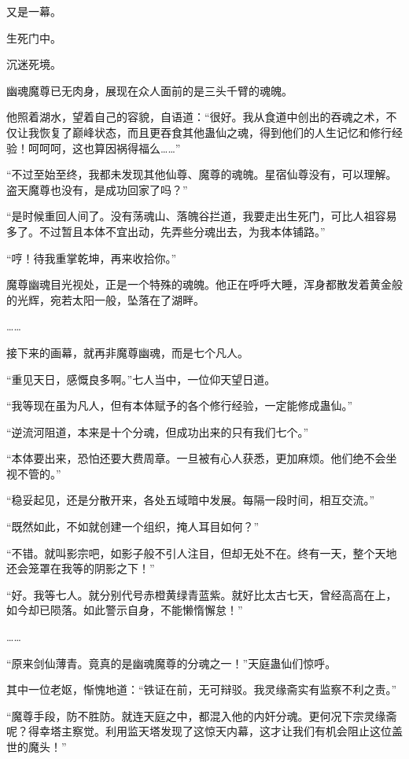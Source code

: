 
\begin{this_body}

又是一幕。

生死门中。

沉迷死境。

幽魂魔尊已无肉身，展现在众人面前的是三头千臂的魂魄。

他照着湖水，望着自己的容貌，自语道：“很好。我从食道中创出的吞魂之术，不仅让我恢复了巅峰状态，而且更吞食其他蛊仙之魂，得到他们的人生记忆和修行经验！呵呵呵，这也算因祸得福么……”

“不过至始至终，我都未发现其他仙尊、魔尊的魂魄。星宿仙尊没有，可以理解。盗天魔尊也没有，是成功回家了吗？”

“是时候重回人间了。没有荡魂山、落魄谷拦道，我要走出生死门，可比人祖容易多了。不过暂且本体不宜出动，先弄些分魂出去，为我本体铺路。”

“哼！待我重掌乾坤，再来收拾你。”

魔尊幽魂目光视处，正是一个特殊的魂魄。他正在呼呼大睡，浑身都散发着黄金般的光辉，宛若太阳一般，坠落在了湖畔。

……

接下来的画幕，就再非魔尊幽魂，而是七个凡人。

“重见天日，感慨良多啊。”七人当中，一位仰天望日道。

“我等现在虽为凡人，但有本体赋予的各个修行经验，一定能修成蛊仙。”

“逆流河阻道，本来是十个分魂，但成功出来的只有我们七个。”

“本体要出来，恐怕还要大费周章。一旦被有心人获悉，更加麻烦。他们绝不会坐视不管的。”

“稳妥起见，还是分散开来，各处五域暗中发展。每隔一段时间，相互交流。”

“既然如此，不如就创建一个组织，掩人耳目如何？”

“不错。就叫影宗吧，如影子般不引人注目，但却无处不在。终有一天，整个天地还会笼罩在我等的阴影之下！”

“好。我等七人。就分别代号赤橙黄绿青蓝紫。就好比太古七天，曾经高高在上，如今却已陨落。如此警示自身，不能懒惰懈怠！”

……

“原来剑仙薄青。竟真的是幽魂魔尊的分魂之一！”天庭蛊仙们惊呼。

其中一位老妪，惭愧地道：“铁证在前，无可辩驳。我灵缘斋实有监察不利之责。”

“魔尊手段，防不胜防。就连天庭之中，都混入他的内奸分魂。更何况下宗灵缘斋呢？得幸塔主察觉。利用监天塔发现了这惊天内幕，这才让我们有机会阻止这位盖世的魔头！”


\end{this_body}
